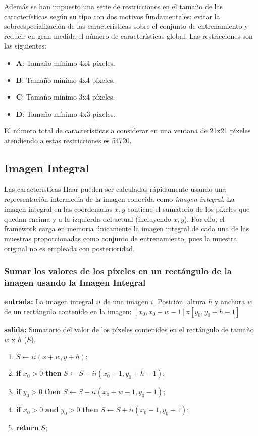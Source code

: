 \documentclass[11pt,spanish,a4paper]{article} %
\begin{document}
Además se han impuesto una serie de restricciones en el tamaño de las características según su tipo con dos motivos fundamentales: evitar la sobreespecialización de las características sobre el conjunto de entrenamiento y reducir en gran medida el número de características global. Las restricciones son las siguientes:

\begin{itemize}
\item \textbf{A}: Tamaño mínimo 4x4 píxeles.
\item \textbf{B}: Tamaño mínimo 4x4 píxeles.
\item \textbf{C}: Tamaño mínimo 3x4 píxeles.
\item \textbf{D}: Tamaño mínimo 4x3 píxeles.
\end{itemize}

El número total de características a considerar en una ventana de 21x21 píxeles atendiendo a estas restricciones es 54720.

\subsection{Imagen Integral}

Las características Haar pueden ser calculadas rápidamente usando una representación intermedia de la imagen conocida como \textit{imagen integral}. La imagen integral en las coordenadas $x, y$ contiene el sumatorio de los píxeles que quedan encima y a la izquierda del actual (incluyendo $x, y$). Por ello, el framework carga en memoria únicamente la imagen integral de cada una de las muestras proporcionadas como conjunto de entrenamiento, pues la muestra original no es empleada con posterioridad.

\subsubsection{Sumar los valores de los píxeles en un rectángulo de la imagen usando la Imagen Integral}

\textbf{entrada:} La imagen integral $ii$ de una imagen $i$. Posición, altura $h$ y anchura $w$ de un rectángulo contenido en la imagen: $[x_0, x_{0}+w-1]$x$[y_0, y_{0}+h-1]$

\textbf{salida:} Sumatorio del valor de los píxeles contenidos en el rectángulo de tamaño $w$ x $h$ ($S$).

\begin{enumerate}\itemsep=-2mm
\item $S \leftarrow ii(x+w, y+h)$;
\item \textbf{if} $x_0 > 0$ \textbf{then} $S \leftarrow S-ii(x_0 - 1, y_0 + h - 1)$;
\item \textbf{if} $y_0 > 0$ \textbf{then} $S \leftarrow S-ii(x_0 + w - 1, y_0 - 1)$;
\item \textbf{if} $x_0 > 0$ \textbf{and} $y_0 > 0$ \textbf{then} $S \leftarrow S+ii(x_0 - 1, y_0 - 1)$;
\item \textbf{return} $S$;
\end{enumerate}
\end{document}
